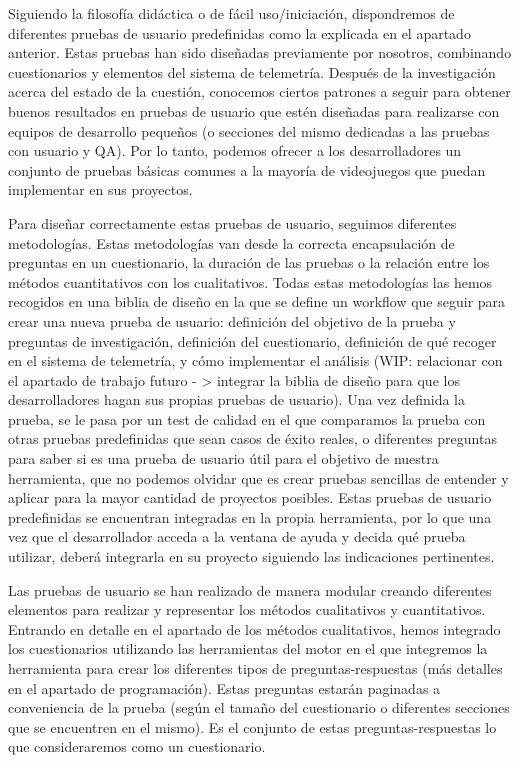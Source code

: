 Siguiendo la filosofía didáctica o de fácil uso/iniciación, dispondremos de diferentes pruebas de usuario predefinidas como la explicada en el apartado anterior. Estas pruebas han sido diseñadas previamente por nosotros, combinando cuestionarios y elementos del sistema de telemetría. Después de la investigación acerca del estado de la cuestión, conocemos ciertos patrones a seguir para obtener buenos resultados en pruebas de usuario que estén diseñadas para realizarse con equipos de desarrollo pequeños (o secciones del mismo dedicadas a las pruebas con usuario y QA). Por lo tanto, podemos ofrecer a los desarrolladores un conjunto de pruebas básicas comunes a la mayoría de videojuegos que puedan implementar en sus proyectos. 

Para diseñar correctamente estas pruebas de usuario, seguimos diferentes metodologías. Estas metodologías van desde la correcta encapsulación de preguntas en un cuestionario, la duración de las pruebas o la relación entre los métodos cuantitativos con los cualitativos. Todas estas metodologías las hemos recogidos en una biblia de diseño en la que se define un workflow que seguir para crear una nueva prueba de usuario: definición del objetivo de la prueba y preguntas de investigación, definición del cuestionario, definición de qué recoger en el sistema de telemetría, y cómo implementar el análisis (WIP: relacionar con el apartado de trabajo futuro - > integrar la biblia de diseño para que los desarrolladores hagan sus propias pruebas de usuario). Una vez definida la prueba, se le pasa por un test de calidad en el que comparamos la prueba con otras pruebas predefinidas que sean casos de éxito reales, o diferentes preguntas para saber si es una prueba de usuario útil para el objetivo de nuestra herramienta, que no podemos olvidar que es crear pruebas sencillas de entender y aplicar para la mayor cantidad de proyectos posibles. Estas pruebas de usuario predefinidas se encuentran integradas en la propia herramienta, por lo que una vez que el desarrollador acceda a la ventana de ayuda y decida qué prueba utilizar, deberá integrarla en su proyecto siguiendo las indicaciones pertinentes. 

Las pruebas de usuario se han realizado de manera modular creando diferentes elementos para realizar y representar los métodos cualitativos y cuantitativos. Entrando en detalle en el apartado de los métodos cualitativos, hemos integrado los cuestionarios utilizando las herramientas del motor en el que integremos la herramienta para crear los diferentes tipos de preguntas-respuestas (más detalles en el apartado de programación). Estas preguntas estarán paginadas a conveniencia de la prueba (según el tamaño del cuestionario o diferentes secciones que se encuentren en el mismo). Es el conjunto de estas preguntas-respuestas lo que consideraremos como un cuestionario.

